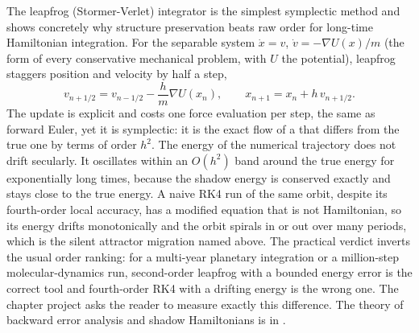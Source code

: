 \begin{mastery}
The leapfrog (Stormer-Verlet) integrator is the simplest symplectic
method and shows concretely why structure preservation beats raw
order for long-time Hamiltonian integration. For the separable system
$\dot{x} = v$, $\dot{v} = -\nabla U(x)/m$ (the form of every
conservative mechanical problem, with $U$ the potential), leapfrog
staggers position and velocity by half a step,
\[
v_{n + 1/2} = v_{n - 1/2} - \frac{h}{m}\nabla U(x_{n}),
\qquad
x_{n+1} = x_{n} + h\, v_{n + 1/2}.
\]
The update is explicit and costs one force evaluation per step, the
same as forward Euler, yet it is symplectic: it is the exact flow of a
 that differs from the true one by terms
of order $h^{2}$. The energy of the numerical trajectory does not drift
secularly. It oscillates within an $O(h^{2})$ band around the true
energy for exponentially long times, because the shadow energy is
conserved exactly and stays close to the true energy. A naive RK4 run
of the same orbit, despite its fourth-order local accuracy, has a
modified equation that is not Hamiltonian, so its energy drifts
monotonically and the orbit spirals in or out over many periods, which
is the silent attractor migration named above. The practical verdict
inverts the usual order ranking: for a multi-year planetary integration
or a million-step molecular-dynamics run, second-order leapfrog with a
bounded energy error is the correct tool and fourth-order RK4 with a
drifting energy is the wrong one. The chapter project asks the reader
to measure exactly this difference. The theory of backward error
analysis and shadow Hamiltonians is in
\textcite{text:v2ch07-hairer-norsett-wanner}.
\end{mastery}

